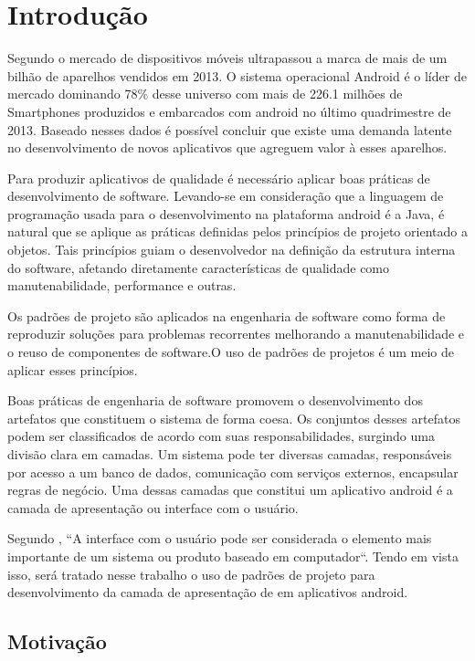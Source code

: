 \chapter{Introdução}

Segundo \cite{idc} o mercado de dispositivos móveis ultrapassou a marca de mais de um
bilhão de aparelhos vendidos em 2013. O sistema operacional Android é o líder
de mercado dominando 78\% desse universo com mais de 226.1 milhões de
Smartphones produzidos e embarcados com android no último quadrimestre de 2013.
Baseado nesses dados é possível concluir que existe uma demanda latente no
desenvolvimento de novos aplicativos que agreguem valor à esses aparelhos.

Para produzir aplicativos de qualidade é necessário aplicar boas práticas de
desenvolvimento de software. Levando-se em consideração que a linguagem de
programação usada para o desenvolvimento na plataforma android é a Java, é
natural que se aplique as práticas definidas pelos princípios de projeto
orientado a objetos. Tais  princípios guiam o desenvolvedor na definição da
estrutura interna do software, afetando diretamente características  de
qualidade como manutenabilidade, performance e outras\cite{tempero-di}.

Os padrões de projeto são aplicados na engenharia de software como forma de
reproduzir  soluções  para problemas recorrentes melhorando a manutenabilidade e
o reuso de componentes de software\cite{gof}.O uso de padrões de projetos
é um meio de aplicar esses princípios. 

Boas práticas de engenharia de software promovem o desenvolvimento dos
artefatos que constituem o sistema de forma coesa. Os conjuntos desses artefatos
podem ser classificados de acordo com suas responsabilidades, surgindo
uma divisão clara em camadas. Um sistema pode ter diversas camadas, responsáveis
por acesso a um banco de dados, comunicação com serviços externos, encapsular
regras de negócio. Uma dessas camadas que constitui um aplicativo android é a
camada de apresentação ou interface com o usuário.
 
Segundo , ``A interface com o usuário pode ser considerada
o elemento mais importante de um sistema ou produto baseado em computador``.
Tendo em vista isso, será tratado nesse trabalho  o uso de padrões de projeto para
desenvolvimento da camada de apresentação de em aplicativos android.

\section{Motivação}

